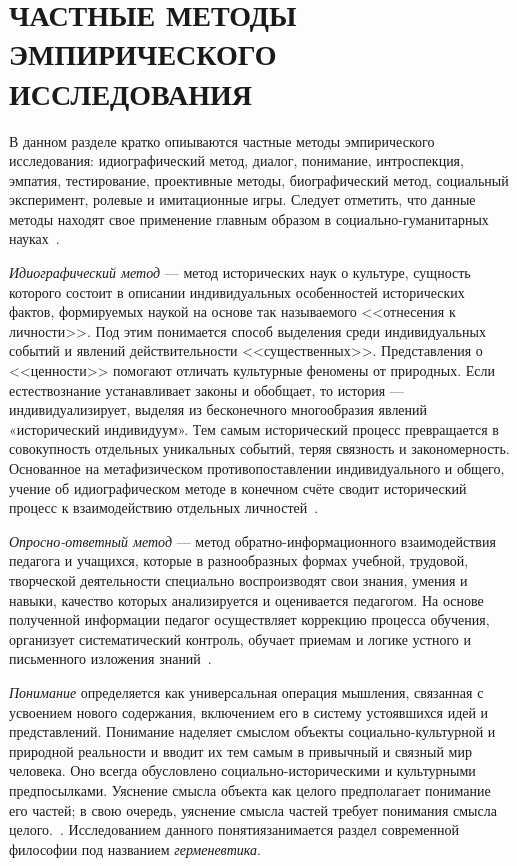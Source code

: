 \section[Частные методы эмпирического исследования]{%
  ЧАСТНЫЕ МЕТОДЫ ЭМПИРИЧЕСКОГО \\ ИССЛЕДОВАНИЯ
}

В данном разделе кратко опиываются частные методы эмпирического исследования:
идиографический метод, диалог, понимание, интроспекция, эмпатия, тестирование,
проективные методы, биографический метод, социальный эксперимент,
ролевые и имитационные игры.
Следует отметить, что данные методы находят свое применение главным образом
в социально-гуманитарных науках~\cite{nekrasov2010}.

\emph{Идиографический метод} --- метод исторических наук о культуре, сущность
которого состоит в описании индивидуальных особенностей исторических фактов,
формируемых наукой на основе так называемого <<отнесения к личности>>.
Под этим понимается способ выделения среди индивидуальных событий и явлений
действительности <<существенных>>.
Представления о <<ценности>> помогают отличать культурные феномены от природных.
Если естествознание устанавливает законы и обобщает, то история --- индивидуализирует,
выделяя из бесконечного многообразия явлений «исторический индивидуум».
Тем самым исторический процесс превращается в совокупность отдельных уникальных событий,
теряя связность и закономерность.
Основанное на метафизическом противопоставлении индивидуального и общего,
учение об идиографическом методе в конечном счёте сводит исторический процесс
к взаимодействию отдельных личностей~\cite{ilychev1983}.

\emph{Опросно-ответный метод} --- метод обратно-информационного взаимодействия
педагога и учащихся, которые в разнообразных формах учебной, трудовой,
творческой деятельности специально воспроизводят свои знания,
умения и навыки, качество которых анализируется и оценивается педагогом.
На основе полученной информации педагог осуществляет коррекцию процесса обучения,
организует систематический контроль, обучает приемам и логике устного
и письменного изложения знаний~\cite{vishnyakova1999}.

\emph{Понимание} определяется как универсальная операция мышления,
связанная с усвоением нового содержания, включением его в систему устоявшихся идей
и представлений. Понимание наделяет смыслом объекты социально-культурной и природной
реальности и вводит их тем самым в привычный и связный мир человека.
Оно всегда обусловлено социально-историческими и культурными предпосылками.
Уяснение смысла объекта как целого предполагает понимание его частей;
в свою очередь, уяснение смысла частей требует понимания смысла целого.~\cite{ivin1997}.
Исследованием данного понятиязанимается раздел современной философии
под названием \emph{герменевтика}.

